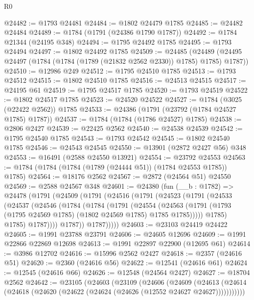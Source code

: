 \begin{lexlean}{R0}
\begin{coremodule}
@24482 := @1793 @24481
@24484 := @1802 @24479 @1785
@24485 := @24482 @24484
@24489 := @1784 (@1791 (@24386 @1790 @1787))
@24492 := @1784 @21344 (@24195 @348)
@24494 := @1795 @24492 @1785
@24495 := @1793 @24494
@24497 := @1802 @24492 @1785
@24509 := @24485
    (@24489 (@24495 @24497 (@1784 (@1784 (@1789 (@21832 @2562 @2330)) @1785) @1785) @1787))
@24510 := @12986 @249
@24512 := @1795 @24510 @1785
@24513 := @1793 @24512
@24515 := @1802 @24510 @1785
@24516 := @24513 @24515
@24517 := @24195 @61
@24519 := @1795 @24517 @1785
@24520 := @1793 @24519
@24522 := @1802 @24517 @1785
@24523 := @24520 @24522
@24527 := @1784 (@3025 (@22422 @2562)) @1785
@24533 := @24386 (@1791 (@23792 (@1784 @24527 @1785) @1787))
@24537 := @1784 (@1784 (@1786 @24527) @1785)
@24538 := @2806 @2427
@24539 := @22425 @2562
@24540 := @24538 @24539
@24542 := @1795 @24540 @1785
@24543 := @1793 @24542
@24545 := @1802 @24540 @1785
@24546 := @24543 @24545
@24550 := @13901 (@2872 @2427 @56) @348
@24553 := @16491 (@2588 @24550 @13921)
@24554 := @23792 @24553
@24563 := @1784 (@1784 (@1784 (@1789 (@24444 @51)) (@1784 @24553 @1785)) @1785)
@24564 := @18176 @2562
@24567 := @2872 (@24564 @51) @24550
@24569 := @2588 @24567 @348
@24601 := @24380
    (fun (__b : @1782) =>
    @24478
      (@1791
        (@24509
          (@1791
            (@24516
              (@1791
                (@24523
                  (@1791
                    (@24533
                      (@24537
                        (@24546
                          (@1784
                            (@1784
                              (@1791
                                (@24554
                                  (@24563
                                    (@1791
                                      (@1793
                                        (@1795 @24569 @1785)
                                        (@1802 @24569 @1785)
                                        @1785
                                        @1785)))))
                              @1785)
                            @1785)
                          @1787))))
                  @1787))
              @1787)))))
@24603 := @23103 @24419 @24422
@24605 := @1991 @23788 @23791
@24606 := @24605 @12696
@24609 := @1991 @22866 @22869 @12698
@24613 := @1991 @22897 @22900 (@12695 @61)
@24614 := @3986 @12702
@24616 := @15996 @2562 @2427
@24618 := @2357 (@24616 @51)
@24620 := @2360 (@24616 @56)
@24622 := @12541 (@24616 @61)
@24624 := @12545 (@24616 @66)
@24626 := @12548 (@24564 @2427)
@24627 := @18704 @2562
@24642 := @23105
    (@24603
      (@23109
        (@24606
          (@24609
            (@24613 (@24614 (@24618 (@24620 (@24622 (@24624 (@24626 (@12552 @24627 @24627)))))))))))

\end{coremodule}
\end{lexlean}
